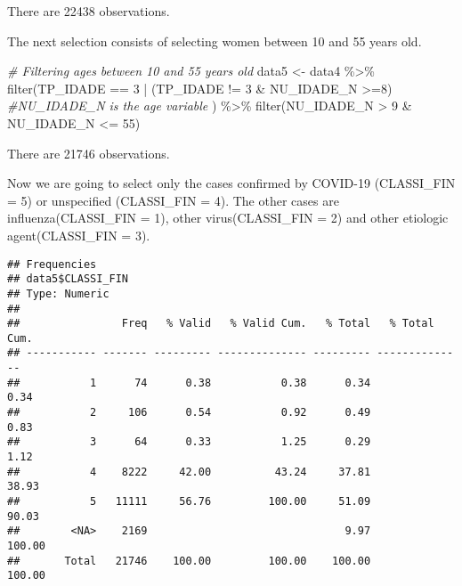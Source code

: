 \documentclass[
]{article}
\newenvironment{Shaded}{\begin{snugshade}}{\end{snugshade}}
\newcommand{\CommentTok}[1]{\textcolor[rgb]{0.56,0.35,0.01}{\textit{#1}}}
\newcommand{\DecValTok}[1]{\textcolor[rgb]{0.00,0.00,0.81}{#1}}
\newcommand{\FunctionTok}[1]{\textcolor[rgb]{0.00,0.00,0.00}{#1}}
\newcommand{\NormalTok}[1]{#1}
\newcommand{\OtherTok}[1]{\textcolor[rgb]{0.56,0.35,0.01}{#1}}
\newcommand{\SpecialCharTok}[1]{\textcolor[rgb]{0.00,0.00,0.00}{#1}}
\begin{document}
There are 22438 observations.

The next selection consists of selecting women between 10 and 55 years
old.

\begin{Shaded}
\begin{Highlighting}[]
\CommentTok{\# Filtering ages between 10 and 55 years old}
\NormalTok{data5 }\OtherTok{\textless{}{-}}\NormalTok{ data4 }\SpecialCharTok{\%\textgreater{}\%}
  \FunctionTok{filter}\NormalTok{(TP\_IDADE }\SpecialCharTok{==} \DecValTok{3} \SpecialCharTok{|}\NormalTok{ (TP\_IDADE }\SpecialCharTok{!=} \DecValTok{3} \SpecialCharTok{\&}\NormalTok{ NU\_IDADE\_N }\SpecialCharTok{\textgreater{}=}\DecValTok{8}\NormalTok{) }\CommentTok{\#NU\_IDADE\_N is the age variable}
\NormalTok{         ) }\SpecialCharTok{\%\textgreater{}\%} 
  \FunctionTok{filter}\NormalTok{(NU\_IDADE\_N }\SpecialCharTok{\textgreater{}} \DecValTok{9} \SpecialCharTok{\&}\NormalTok{ NU\_IDADE\_N }\SpecialCharTok{\textless{}=} \DecValTok{55}\NormalTok{)}
\end{Highlighting}
\end{Shaded}

There are 21746 observations.

Now we are going to select only the cases confirmed by COVID-19
(CLASSI\_FIN = 5) or unspecified (CLASSI\_FIN = 4). The other cases are
influenza(CLASSI\_FIN = 1), other virus(CLASSI\_FIN = 2) and other
etiologic agent(CLASSI\_FIN = 3).

\begin{Shaded}
\end{Shaded}

\begin{verbatim}
## Frequencies  
## data5$CLASSI_FIN  
## Type: Numeric  
## 
##                Freq   % Valid   % Valid Cum.   % Total   % Total Cum.
## ----------- ------- --------- -------------- --------- --------------
##           1      74      0.38           0.38      0.34           0.34
##           2     106      0.54           0.92      0.49           0.83
##           3      64      0.33           1.25      0.29           1.12
##           4    8222     42.00          43.24     37.81          38.93
##           5   11111     56.76         100.00     51.09          90.03
##        <NA>    2169                               9.97         100.00
##       Total   21746    100.00         100.00    100.00         100.00
\end{verbatim}
\end{document}
